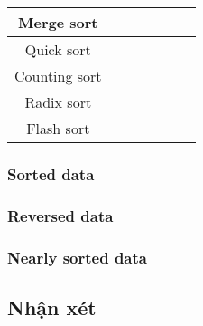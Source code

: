 \begin{table}[!ht]
{\begin{tabular}{|c|c|c|c|c|c|c|}
    Merge sort                 &                 &               &                &               &               &                 \\ \hline
    Quick sort                 &                 &               &                &               &               &                 \\ \hline
    Counting sort              &                 &               &                &               &               &                 \\ \hline
    Radix sort                 &                 &               &                &               &               &                 \\ \hline
    Flash sort                 &                 &               &                &               &               &                 \\ \hline
    \end{tabular}}
    \end{table}
\subsubsection{Sorted data}

\subsubsection{Reversed data}

\subsubsection{Nearly sorted data}

\subsection{Nhận xét}